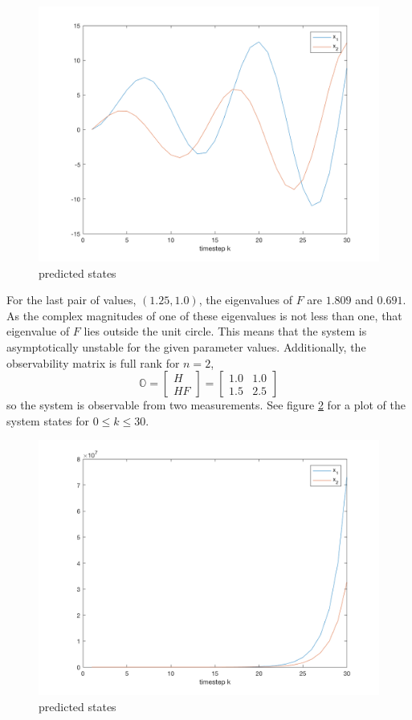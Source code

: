 \documentclass[11pt]{article}
\begin{document}
\begin{figure}[h!]
	\centering
	\includegraphics[width=0.6\linewidth]{2b_plot2.png}
	\caption{predicted states}
	\label{fig:2b_plot2}
\end{figure}

For the last pair of values, $(1.25,1.0)$, the eigenvalues of $F$ are $1.809$ and $0.691$. As the complex magnitudes of one of these eigenvalues is not less than one, that eigenvalue of $F$ lies outside the unit circle. This means that the system is asymptotically unstable for the given parameter values. Additionally, the observability matrix is full rank for $n=2$, 
\begin{equation*}
	\mathbb{O} = \begin{bmatrix} H \\ HF \end{bmatrix} = \begin{bmatrix} 1.0 & 1.0 \\ 1.5 & 2.5 \end{bmatrix}
\end{equation*}
so the system is observable from two measurements. See figure \ref{fig:2b_plot3} for a plot of the system states for $0\leq k\leq 30$.

\begin{figure}[h!]
	\centering
	\includegraphics[width=0.6\linewidth]{2b_plot3.png}
	\caption{predicted states}
	\label{fig:2b_plot3}
\end{figure}
\end{document}

